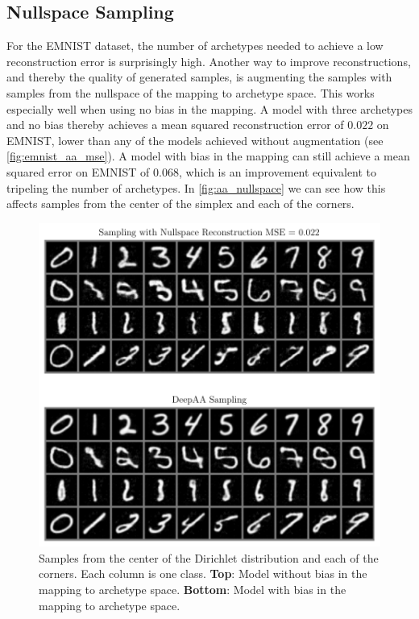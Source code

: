 \subsection{Nullspace Sampling}%
\label{sub:nullspace_sampling}

For the EMNIST dataset, the number of archetypes needed to achieve a low
reconstruction error is surprisingly high. Another way to improve
reconstructions, and thereby the quality of generated samples, is augmenting the
samples with samples from the nullspace of the mapping to archetype space. This
works especially well when using no bias in the mapping. A model with three
archetypes and no bias thereby achieves a mean squared reconstruction error of
$0.022$ on EMNIST, lower than any of the models achieved without augmentation
(see \autoref{fig:emnist_aa_mse}). A model with bias in the mapping can still
achieve a mean squared error on EMNIST of $0.068$, which is an improvement
equivalent to tripeling the number of archetypes. In \autoref{fig:aa_nullspace}
we can see how this affects samples from the center of the simplex and each of
the corners.
\begin{figure}[htpb]
	\centering
		\includegraphics{figures/samples/aa_nullspace.pdf}
	\caption{Samples from the center of the Dirichlet distribution and each
		of the corners. Each column is one class. \textbf{Top}: Model without bias in
		the mapping to archetype space. \textbf{Bottom}: Model with bias in the mapping to
		archetype space.}%
	\label{fig:aa_nullspace}
\end{figure}
